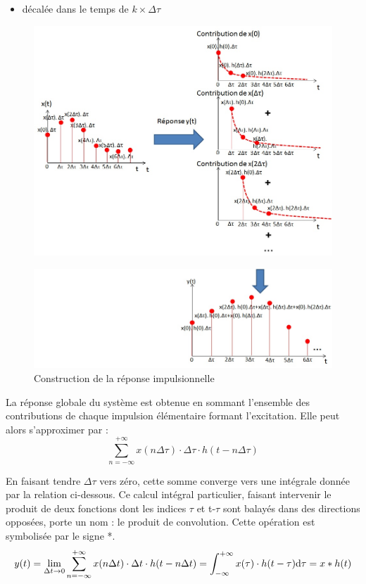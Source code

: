 \documentclass[]{book}
\begin{document}
{\begin{itemize}
		\item décalée dans le temps de $ k \times \Delta \tau $~
	\end{itemize}
	\begin{figure}[h!]
		\centering
		\includegraphics[scale=0.5]{images/illustration_reponse_impuls.jpg} 
	\end{figure}
	\begin{figure}[h!]
		\centering
		\includegraphics[scale=0.6]{images/illustration_reponse_impuls_2.jpg}
		\caption{Construction de la réponse impulsionnelle}	
		\label{Fig:illustration_reponse_impuls_2} 
	\end{figure}

	La réponse globale du système est obtenue en sommant l'ensemble des contributions de chaque impulsion élémentaire formant l'excitation. Elle peut alors s'approximer par : 
	\begin{equation*}\label{key}
	\sum_{n=-\infty}^{+\infty} x(n\Delta \tau) \cdot \Delta \tau \cdot h(t-n\Delta \tau)
	\end{equation*}
	
	En faisant tendre $ \Delta \tau $ vers zéro, cette somme converge vers une intégrale
	donnée par la relation ci-dessous. Ce calcul intégral particulier,
	faisant intervenir le produit de deux fonctions dont les indices $\tau $ et
	t-$\tau $ sont balayés dans des directions opposées, porte un nom : le produit
	de convolution. Cette opération est symbolisée par le signe *.
	\begin{equation}\label{Demo_produit_convolution}
	y(t) = \lim_{\Delta t \to 0} \sum_{n=-\infty}^{+\infty} x(n\Delta t) \cdot \Delta t \cdot h(t-n\Delta t) = \int_{-\infty}^{+\infty} x(\tau) \cdot h(t-\tau) \mathrm{d} \tau = x*h(t)
	\end{equation}
	
}
\end{document}
